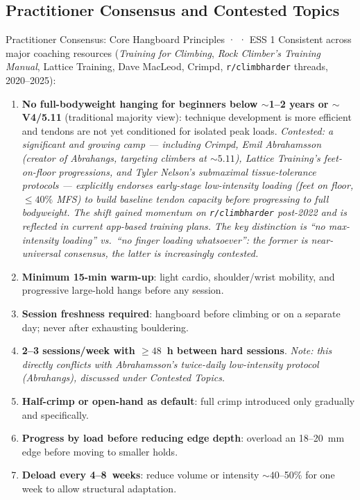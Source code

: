 \subsection{Practitioner Consensus and Contested Topics}
\label{sec:practitioner}

\begin{folklorebox}{Practitioner Consensus: Core Hangboard Principles · \folkloreverified · ESS 1}
Consistent across major coaching resources (\textit{Training for Climbing}, \textit{Rock Climber's Training Manual}, Lattice Training, Dave MacLeod, Crimpd, \texttt{r/climbharder} threads, 2020--2025):
\begin{enumerate}[noitemsep, topsep=2pt]
  \item \textbf{No full-bodyweight hanging for beginners below ${\sim}$1--2 years or ${\sim}$V4/5.11} (traditional majority view): technique development is more efficient and tendons are not yet conditioned for isolated peak loads. \textit{Contested: a significant and growing camp — including Crimpd, Emil Abrahamsson (creator of Abrahangs, targeting climbers at ${\sim}5.11$), Lattice Training's feet-on-floor progressions, and Tyler Nelson's submaximal tissue-tolerance protocols — explicitly endorses early-stage low-intensity loading (feet on floor, $\leq40\%$ MFS) to build baseline tendon capacity before progressing to full bodyweight. The shift gained momentum on \texttt{r/climbharder} post-2022 and is reflected in current app-based training plans. The key distinction is ``no max-intensity loading'' vs.\ ``no finger loading whatsoever'': the former is near-universal consensus, the latter is increasingly contested.}
  \item \textbf{Minimum 15-min warm-up}: light cardio, shoulder/wrist mobility, and progressive large-hold hangs before any session.
  \item \textbf{Session freshness required}: hangboard before climbing or on a separate day; never after exhausting bouldering.
  \item \textbf{2--3 sessions/week with $\geq48$~h between hard sessions}. \textit{Note: this directly conflicts with Abrahamsson's twice-daily low-intensity protocol (Abrahangs), discussed under Contested Topics.}
  \item \textbf{Half-crimp or open-hand as default}: full crimp introduced only gradually and specifically.
  \item \textbf{Progress by load before reducing edge depth}: overload an 18--20~mm edge before moving to smaller holds.
  \item \textbf{Deload every 4--8~weeks}: reduce volume or intensity ${\sim}40$--50\% for one week to allow structural adaptation.
\end{enumerate}
\end{folklorebox}

